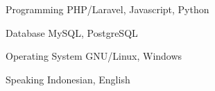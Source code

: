 


\begin{cvskills}


\cvskill
{Programming} %
{PHP/Laravel, Javascript, Python} %




\cvskill
{Database} %
{MySQL, PostgreSQL} %


\cvskill
{Operating System} %
{GNU/Linux, Windows} %


\cvskill
{Speaking} %
{Indonesian, English} %




\end{cvskills}
